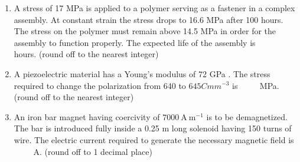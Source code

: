 \documentclass[journal]{IEEEtran}
\begin{document}
\begin{enumerate}
    \item  A stress of 17 MPa is applied to a polymer serving as a fastener in a complex assembly. At constant strain the stress drops to 16.6 MPa after 100 hours. The stress on the polymer must remain above 14.5 MPa in order for the assembly to function properly. The expected life of the assembly is $\qquad$ hours. (round off to the nearest integer)
    
    

    \item  A piezoelectric material has a Young's modulus of 72 GPa . The stress required to change the polarization from 640 to $645 {C} {m} {m}^{-3}$ is $\qquad$ MPa. (round off to the nearest integer)
    \item  An iron bar magnet having coercivity of $7000 \mathrm{~A} \mathrm{~m}^{-1}$ is to be demagnetized. The bar is introduced fully inside a 0.25 m long solenoid having 150 turns of wire. The electric current required to generate the necessary magnetic field is $\qquad$ A. (round off to 1 decimal place)

        
 \end{enumerate}
\end{document}
